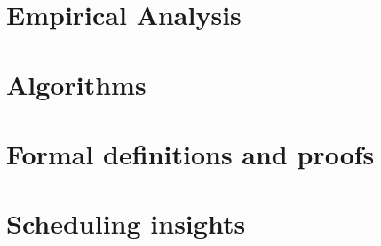 \documentclass[USenglish,oneside,twocolumn]{article}
\begin{document}
\section{Empirical Analysis}
\label{sec:analysis}


\section{Algorithms}
\label{sec:algorithms}


\section{Formal definitions and proofs}
\label{sec:proof}



\section{Scheduling insights}
\label{sec:scheduling}


\end{document}
